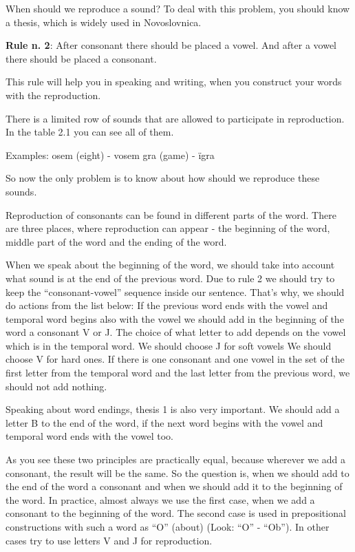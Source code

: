 When should we reproduce a sound? To deal with this problem, you should know a thesis, which is widely used in Novoslovnica.

\textbf{Rule n. 2}: After consonant there should be placed a vowel. And after a vowel there should be placed a consonant.

This rule will help you in speaking and writing, when you construct your words with the reproduction.

There is a limited row of sounds that are allowed to participate in reproduction. In the table 2.1 you can see all of them.



Examples:
osem (eight) \textipa{[‘osEm]} - vosem \textipa{[‘vosEm]}
gra (game) \textipa{[Hra]} - ïgra \textipa{[i’Hra]}

So now the only problem is to know about how should we reproduce these sounds.

Reproduction of consonants can be found in different parts of the word. There are three places, where reproduction can appear - the beginning of the word, middle part of the word and the ending of the word.

When we speak about the beginning of the word, we should take into account what sound is at the end of the previous word. Due to rule 2 we should try to keep the “consonant-vowel” sequence inside our sentence. That’s why, we should do actions from the list below:
If the previous word ends with the vowel and temporal word begins also with the vowel we should add in the beginning of the word a consonant V or J. The choice of what letter to add depends on the vowel which is in the temporal word.
We should choose J for soft vowels
We should choose V for hard ones.
If there is one consonant and one vowel in the set of the first letter from the temporal word and the last letter from the previous word, we should not add nothing.

Speaking about word endings, thesis 1 is also very important. We should add a letter B to the end of the word, if the next word begins with the vowel and temporal word ends with the vowel too.

As you see these two principles are practically equal, because wherever we add a consonant, the result will be the same. So the question is, when we should add to the end of the word a consonant and when we should add it to the beginning of the word. In practice, almost always we use the first case, when we add a consonant to the beginning of the word. The second case is used in prepositional constructions with such a word as “O” (about) (Look: “O” - “Ob”). In other cases try to use letters V and J for reproduction.

